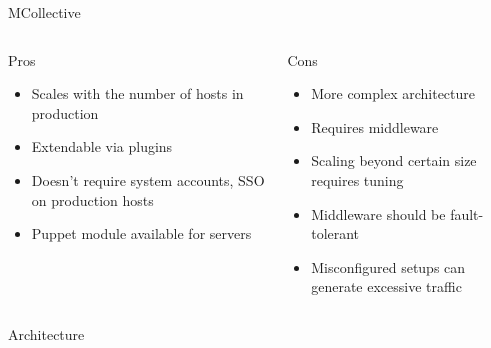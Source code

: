\documentclass[presentation]{beamer}
\begin{document}
\begin{frame}[label=sec-7-4]{MCollective}
\begin{columns}
\begin{column}{0.5\textwidth}
\begin{block}{Pros}

\begin{itemize}
\item Scales with the number of hosts in production
\item Extendable via plugins
\item Doesn't require system accounts, SSO on production hosts
\item Puppet module available for servers
\end{itemize}
\end{block}
\end{column}

\begin{column}{0.5\textwidth}
\begin{block}{Cons}

\begin{itemize}
\item More complex architecture
\item Requires middleware
\item Scaling beyond certain size requires tuning
\item Middleware should be fault-tolerant
\item Misconfigured setups can generate excessive traffic
\end{itemize}
\end{block}
\end{column}
\end{columns}
\end{frame}

\begin{frame}[label=sec-7-5]{Architecture}
\end{frame}
\end{document}
